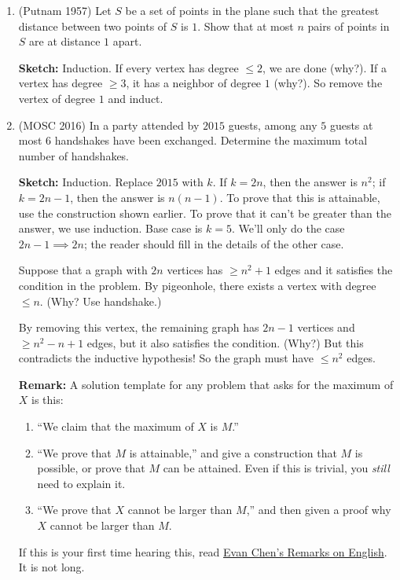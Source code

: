 \documentclass[11pt,paper=letter]{scrartcl}
\begin{document}
\begin{enumerate}
  \item (Putnam 1957) Let $S$ be a set of points in the plane such that the greatest distance between two points of $S$ is $1$. Show that at most $n$ pairs of points in $S$ are at distance $1$ apart.

  \textbf{Sketch:} Induction. If every vertex has degree $\le 2$, we are done (why?). If a vertex has degree $\ge 3$, it has a neighbor of degree $1$ (why?). So remove the vertex of degree $1$ and induct.

  \item (MOSC 2016) In a party attended by $2015$ guests, among any $5$ guests at most $6$ handshakes have been exchanged. Determine the maximum total number of handshakes.

  \textbf{Sketch:} Induction. Replace $2015$ with $k$. If $k = 2n$, then the answer is $n^2$; if $k = 2n - 1$, then the answer is $n(n-1)$. To prove that this is attainable, use the construction shown earlier. To prove that it can't be greater than the answer, we use induction. Base case is $k = 5$. We'll only do the case $2n - 1 \implies 2n$; the reader should fill in the details of the other case. 

  Suppose that a graph with $2n$ vertices has $\ge n^2 + 1$ edges and it satisfies the condition in the problem. By pigeonhole, there exists a vertex with degree $\le n$. (Why? Use handshake.)

  By removing this vertex, the remaining graph has $2n-1$ vertices and $\ge n^2 - n + 1$ edges, but it also satisfies the condition. (Why?) But this contradicts the inductive hypothesis! So the graph must have $\le n^2$ edges.

  \textbf{Remark:} A solution template for any problem that asks for the maximum of $X$ is this:
  \begin{enumerate}
    \item ``We claim that the maximum of $X$ is $M$.''
    \item ``We prove that $M$ is attainable,'' and give a construction that $M$ is possible, or prove that $M$ can be attained. Even if this is trivial, you \emph{still} need to explain it.
    \item ``We prove that $X$ cannot be larger than $M$,'' and then given a proof why $X$ cannot be larger than $M$. 
  \end{enumerate}
  If this is your first time hearing this, read \href{http://web.evanchen.cc/handouts/english/english.pdf}{Evan Chen's Remarks on English}. It is not long.


\end{enumerate}
\end{document}
